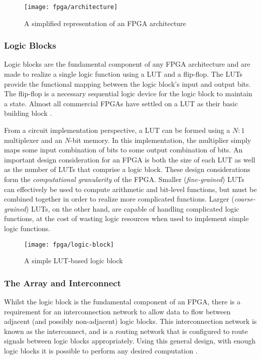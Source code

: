 \begin{figure}
    \centering
    \texttt{[image: fpga/architecture]}
    \caption[A simplified representation of an \gls{FPGA} architecture]{A
        simplified representation of an \gls{FPGA} architecture
        \cite{Hauck:2007}}
    \label{fig:fpga:architecture}
\end{figure}

\subsubsection{Logic Blocks}
\label{fpga:architecture:logicBlocks}
Logic blocks are the fundamental component of any \gls{FPGA} architecture and
are made to realize a single logic function using a \gls{LUT} and a flip-flop.
The \glspl{LUT} provide the functional mapping between the logic block's input
and output bits. The flip-flop is a necessary sequential logic device for the
logic block to maintain a state. Almost all commercial \glspl{FPGA} have settled
on a \gls{LUT} as their basic building block \cite{Hauck:2007}.

From a circuit implementation perspective, a \gls{LUT} can be formed using a
$N:1$ multiplexer and an $N$-bit memory. In this implementation, the multiplier
simply maps some input combination of bits to some output combination of bits.
An important design consideration for an \gls{FPGA} is both the size of each
\gls{LUT} as well as the number of \glspl{LUT} that comprise a logic block.
These design considerations form the \emph{computational granularity} of the
\gls{FPGA}. Smaller (\emph{fine-grained}) \glspl{LUT} can effectively be used to
compute arithmetic and bit-level functions, but must be combined together in
order to realize more complicated functions. Larger (\emph{coarse-grained})
\glspl{LUT}, on the other hand, are capable of handling complicated logic
functions, at the cost of wasting logic resources when used to implement simple
logic functions.

\begin{figure}
    \centering
    \texttt{[image: fpga/logic-block]}
    \caption[A simple \gls{LUT}-based logic block]{A simple \gls{LUT}-based
        logic block \cite{Hauck:2007}}
    \label{fig:fpga:logicBlock}
\end{figure}

\subsubsection{The Array and Interconnect}
\label{fpga:architecture:arrayAndInterconnect}
Whilst the logic block is the fundamental component of an \gls{FPGA}, there is a
requirement for an interconnection network to allow data to flow between
adjacent (and possibly non-adjacent) logic blocks. This interconnection network
is known as the interconnect, and is a routing network that is configured to
route signals between logic blocks appropriately. Using this general design,
with enough logic blocks it is possible to perform any desired computation
\cite{Hauck:2007}.

